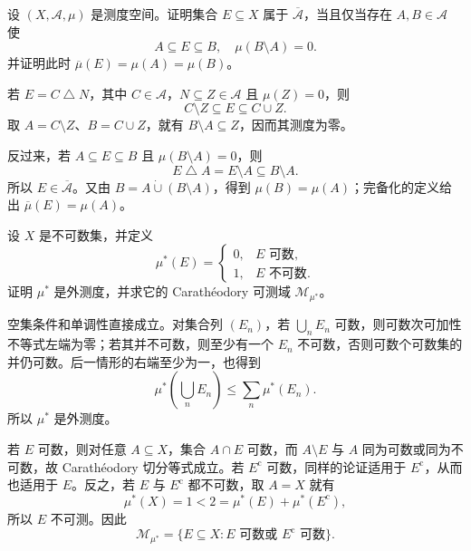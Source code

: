 \begin{exercise}
\label{b1:ex:0204}
设 \((X,\mathcal A,\mu)\) 是测度空间。证明集合 \(E\subseteq X\) 属于 \(\overline{\mathcal A}\)，当且仅当存在 \(A,B\in\mathcal A\) 使
\[
A\subseteq E\subseteq B,
\quad
\mu(B\setminus A)=0.
\]
并证明此时 \(\overline\mu(E)=\mu(A)=\mu(B)\)。
\end{exercise}
\begin{solution}
若 \(E=C\mathbin{\triangle}N\)，其中 \(C\in\mathcal A\)，\(N\subseteq Z\in\mathcal A\) 且 \(\mu(Z)=0\)，则
\[
C\setminus Z\subseteq E\subseteq C\cup Z.
\]
取 \(A=C\setminus Z\)、\(B=C\cup Z\)，就有 \(B\setminus A\subseteq Z\)，因而其测度为零。

反过来，若 \(A\subseteq E\subseteq B\) 且 \(\mu(B\setminus A)=0\)，则
\[
E\mathbin{\triangle}A=E\setminus A\subseteq B\setminus A.
\]
所以 \(E\in\overline{\mathcal A}\)。又由 \(B=A\mathbin{\dot\cup}(B\setminus A)\)，得到 \(\mu(B)=\mu(A)\)；完备化的定义给出 \(\overline\mu(E)=\mu(A)\)。
\end{solution}

\begin{exercise}
\label{b1:ex:0205}
设 \(X\) 是不可数集，并定义
\[
\mu^*(E)=
\begin{cases}
0,&E\text{ 可数},\\
1,&E\text{ 不可数}.
\end{cases}
\]
证明 \(\mu^*\) 是外测度，并求它的 Carathéodory 可测域 \(\mathcal M_{\mu^*}\)。
\end{exercise}
\begin{solution}
空集条件和单调性直接成立。对集合列 \((E_n)\)，若 \(\bigcup_nE_n\) 可数，则可数次可加性不等式左端为零；若其并不可数，则至少有一个 \(E_n\) 不可数，否则可数个可数集的并仍可数。后一情形的右端至少为一，也得到
\[
\mu^*\left(\bigcup_nE_n\right)\leq\sum_n\mu^*(E_n).
\]
所以 \(\mu^*\) 是外测度。

若 \(E\) 可数，则对任意 \(A\subseteq X\)，集合 \(A\cap E\) 可数，而 \(A\setminus E\) 与 \(A\) 同为可数或同为不可数，故 Carathéodory 切分等式成立。若 \(E^{\mathrm c}\) 可数，同样的论证适用于 \(E^{\mathrm c}\)，从而也适用于 \(E\)。反之，若 \(E\) 与 \(E^{\mathrm c}\) 都不可数，取 \(A=X\) 就有
\[
\mu^*(X)=1
<2=\mu^*(E)+\mu^*(E^{\mathrm c}),
\]
所以 \(E\) 不可测。因此
\[
\mathcal M_{\mu^*}
=\{E\subseteq X:E\text{ 可数或 }E^{\mathrm c}\text{ 可数}\}.
\]
\end{solution}

